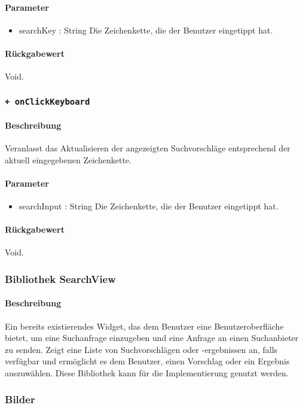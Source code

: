 \paragraph*{Parameter}
\begin{itemize}
    \item searchKey : String Die Zeichenkette, die der Benutzer eingetippt hat.
\end{itemize}
\paragraph*{Rückgabewert}
Void.

\subsubsection*{\texttt{+ onClickKeyboard}}%
\paragraph*{Beschreibung}
Veranlasst das Aktualisieren der angezeigten Suchvorschläge entsprechend der aktuell eingegebenen Zeichenkette.
\paragraph*{Parameter}
\begin{itemize}
    \item searchInput : String Die Zeichenkette, die der Benutzer eingetippt hat.
\end{itemize}
\paragraph*{Rückgabewert}
Void.


\subsubsection*{Bibliothek SearchView}
\paragraph*{Beschreibung}
Ein bereits existierendes Widget, das dem Benutzer eine Benutzeroberfläche bietet, um eine Suchanfrage einzugeben und eine Anfrage an einen Suchanbieter zu senden. 
Zeigt eine Liste von Suchvorschlägen oder -ergebnissen an, falls verfügbar 
und ermöglicht es dem Benutzer, einen Vorschlag oder ein Ergebnis auszuwählen.
Diese Bibliothek kann für die Implementierung genutzt werden.

\subsubsection*{Bilder}
\begin{minipage}{\linewidth}
    \centering
    \begin{minipage}{.49\textwidth}
        \captionsetup[figure]{labelformat=empty}
        \captionsetup[figure]{labelformat=default}
    \end{minipage}
\end{minipage}